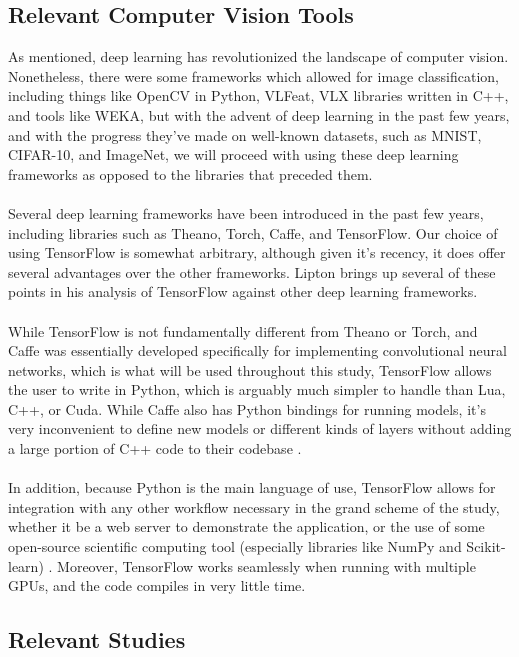\documentclass{article}
\begin{document}
\subsection{Relevant Computer Vision Tools}

As mentioned, deep learning has revolutionized the landscape of computer vision. Nonetheless, there were some frameworks which allowed for image classification, including things like OpenCV in Python, VLFeat, VLX libraries written in C++, and tools like WEKA, but with the advent of deep learning in the past few years, and with the progress they've made on well-known datasets, such as MNIST, CIFAR-10, and ImageNet, we will proceed with using these deep learning frameworks as opposed to the libraries that preceded them.
\\ \\
Several deep learning frameworks have been introduced in the past few years, including libraries such as Theano, Torch, Caffe, and TensorFlow. Our choice of using TensorFlow is somewhat arbitrary, although given it's recency, it does offer several advantages over the other frameworks. Lipton brings up several of these points in his analysis of TensorFlow against other deep learning frameworks.
\\ \\
While TensorFlow is not fundamentally different from Theano or Torch, and Caffe was essentially developed specifically for implementing convolutional neural networks, which is what will be used throughout this study, TensorFlow allows the user to write in Python, which is arguably much simpler to handle than Lua, C++, or Cuda. While Caffe also has Python bindings for running models, it's very inconvenient to define new models or different kinds of layers without adding a large portion of C++ code to their codebase \cite{lipton15}.
\\ \\
In addition, because Python is the main language of use, TensorFlow allows for integration with any other workflow necessary in the grand scheme of the study, whether it be a web server to demonstrate the application, or the use of some open-source scientific computing tool (especially libraries like NumPy and Scikit-learn) \cite{lipton15}. Moreover, TensorFlow works seamlessly when running with multiple GPUs, and the code compiles in very little time. 

\subsection{Relevant Studies}
\end{document}
